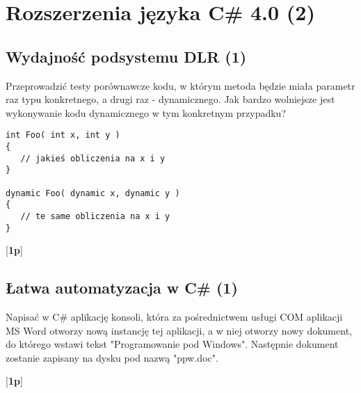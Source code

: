 ﻿\section{Rozszerzenia języka C\# 4.0 (2)}

\subsection{Wydajność podsystemu DLR (1)}

Przeprowadzić testy porównawcze kodu, w którym metoda będzie miała parametr raz typu konkretnego, 
\label{wydajnosc_dlr}
a drugi raz - dynamicznego. Jak bardzo wolniejsze jest wykonywanie kodu dynamicznego w tym konkretnym przypadku?

\begin{verbatim}
int Foo( int x, int y )
{
   // jakieś obliczenia na x i y
}

dynamic Foo( dynamic x, dynamic y )
{
   // te same obliczenia na x i y 
}

\end{verbatim}

  [{\bf 1p}]	 

\subsection{Łatwa automatyzacja w C\# (1)}

      Napisać w C\# aplikację konsoli, która za pośrednictwem usługi COM aplikacji MS Word otworzy nową instancję tej aplikacji, a w niej otworzy
\label{latwa_automatyzacja}	  
	  nowy dokument,
      do którego wstawi tekst "Programowanie pod Windows". Następnie dokument zostanie zapisany na dysku pod nazwą "ppw.doc".
	  
  [{\bf 1p}]	 

